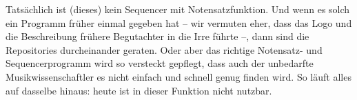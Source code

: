 Tatsächlich ist (dieses)  kein Sequencer mit Notensatzfunktion. Und
wenn es solch ein Programm früher einmal gegeben hat -- wir vermuten eher, dass
das Logo und die Beschreibung frühere Begutachter in die Irre führte --, dann
sind die Repositories durcheinander geraten. Oder aber das richtige Notensatz-
und Sequencerprogramm  wird so versteckt gepflegt, dass auch der
unbedarfte Musikwissenschaftler es nicht einfach und schnell genug finden wird.
So läuft alles auf dasselbe hinaus: heute ist  in dieser Funktion
nicht nutzbar.


%
